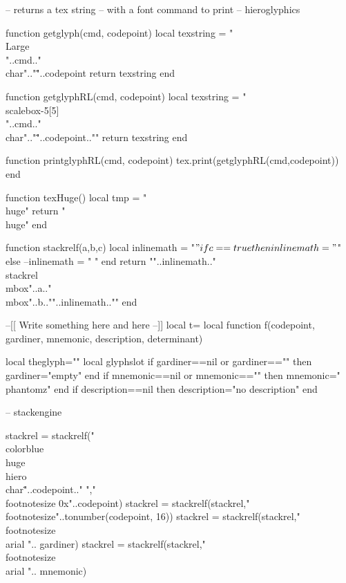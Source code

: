 \documentclass{article}
\begin{document}
\newfontfamily{}
\newfontfamily{}
\newfontfamily{}
\newfontfamily{}
\parindent0pt

\begin{luacode*}
-- returns a tex string
-- with a font command to print 
-- hieroglyphics

function getglyph(cmd, codepoint)
  local texstring = "\\Large\\"..cmd.." \\char".."\""..codepoint
  return texstring
end

function getglyphRL(cmd, codepoint)
  local texstring = "\\scalebox{-5}[5]{\\"..cmd.." \\char".."\""..codepoint.."}"
  return texstring
end

function printglyphRL(cmd, codepoint)
  tex.print(getglyphRL(cmd,codepoint))
end

function texHuge()
   local tmp = "\\huge"
   return "\\huge"
end

function stackrelf(a,b,c)
  local inlinemath = "$"
  if c==true then inlinemath="$"
  else
     --inlinemath = " "
  end
  return ""..inlinemath.."\\stackrel{\\mbox{"..a.."}}{\\mbox{"..b.."}}"..inlinemath..""
end

--[[
Write something here
and here
--]]
local t={}
local function f(codepoint, gardiner, 
                 mnemonic,
                 description, determinant)

    local theglyph=""
    local glyphslot
	 if gardiner==nil or gardiner=="" then gardiner="empty" end
    if mnemonic==nil or mnemonic=="" then mnemonic="\\phantom{z}" end
    if description==nil then description="no description" end
    

     

-- stackengine 
 
  stackrel = stackrelf("\\color{blue}\\huge\\hiero\\char\""..codepoint.." ","\\footnotesize 0x"..codepoint)
   stackrel = stackrelf(stackrel,"\\footnotesize"..tonumber(codepoint, 16))
   stackrel = stackrelf(stackrel,"\\footnotesize \\arial ".. gardiner)
stackrel = stackrelf(stackrel,"\\footnotesize \\arial ".. mnemonic)
  

\end{luacode*}
\end{document}
